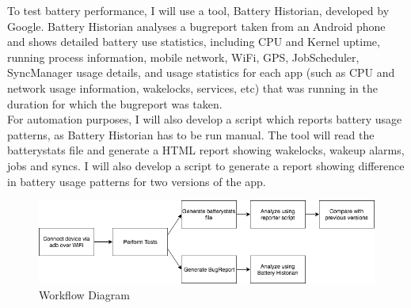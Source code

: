 To test battery performance, I will use a tool, Battery Historian, developed by Google. Battery Historian analyses a bugreport taken from an Android phone and shows detailed battery use statistics, including CPU and Kernel uptime, running process information, mobile network, WiFi, GPS, JobScheduler, SyncManager usage details, and usage statistics for each app (such as CPU and network usage information, wakelocks, services, etc) that was running in the duration for which the bugreport was taken.\cite{batteryhistorian} \\

For automation purposes, I will also develop a script which reports battery usage patterns, as Battery Historian has to be run manual. The tool will read the batterystats file and generate a HTML report showing wakelocks, wakeup alarms, jobs and syncs. I will also develop a script to generate a report showing difference in battery usage patterns for two versions of the app.

\begin{figure}[!h]
 	\begin{center}
		\includegraphics[scale=0.6]{Workflow}
		\caption{Workflow Diagram}
	\end{center}
\end{figure}
